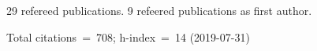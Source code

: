 29 refereed publications. 9 refeered publications as first author.

Total citations~=~708; h-index~=~14 (2019-07-31)